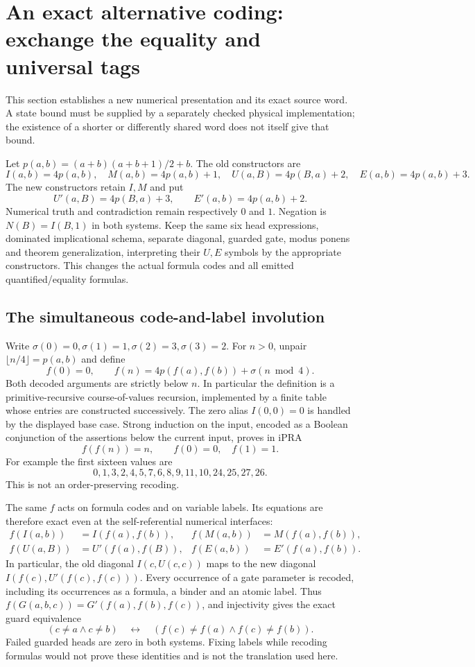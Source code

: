 \section{An exact alternative coding: exchange the equality and universal tags}
\label{sec:ue-tag-swap}

This section establishes a new numerical presentation and its exact source
word.  A state bound must be supplied by a separately checked physical
implementation; the existence of a shorter or differently shared word does
not itself give that bound.

Let $p(a,b)=(a+b)(a+b+1)/2+b$.  The old constructors are
\[
 I(a,b)=4p(a,b),\quad M(a,b)=4p(a,b)+1,\quad
 U(a,B)=4p(B,a)+2,\quad E(a,b)=4p(a,b)+3.
\]
The new constructors retain $I,M$ and put
\[
       U'(a,B)=4p(B,a)+3,\qquad E'(a,b)=4p(a,b)+2.
\]
Numerical truth and contradiction remain respectively $0$ and $1$.
Negation is $N(B)=I(B,1)$ in both systems.  Keep the same six head
expressions, dominated implicational schema, separate diagonal, guarded
gate, modus ponens and theorem generalization, interpreting their $U,E$
symbols by the appropriate constructors.  This changes the actual formula
codes and all emitted quantified/equality formulas.

\subsection{The simultaneous code-and-label involution}

Write $\sigma(0)=0,\sigma(1)=1,\sigma(2)=3,\sigma(3)=2$.
For $n>0$, unpair $\lfloor n/4\rfloor=p(a,b)$ and define
\[
 f(0)=0,\qquad f(n)=4p(f(a),f(b))+\sigma(n\bmod4).
\]
Both decoded arguments are strictly below $n$.  In particular the
definition is a primitive-recursive course-of-values recursion, implemented
by a finite table whose entries are constructed successively.  The zero
alias $I(0,0)=0$ is handled by the displayed base case.  Strong induction
on the input, encoded as a Boolean conjunction of the assertions below the
current input, proves in iPRA
\[
                 f(f(n))=n,\qquad f(0)=0,\quad f(1)=1.
\]
For example the first sixteen values are
\[
 0,1,3,2,4,5,7,6,8,9,11,10,24,25,27,26.
\]
This is not an order-preserving recoding.

The same $f$ acts on formula codes and on variable labels.  Its equations
are therefore exact even at the self-referential numerical interfaces:
\[
\begin{aligned}
 f(I(a,b))&=I(f(a),f(b)),&
 f(M(a,b))&=M(f(a),f(b)),\\
 f(U(a,B))&=U'(f(a),f(B)),&
 f(E(a,b))&=E'(f(a),f(b)).
\end{aligned}
\]
In particular, the old diagonal $I(c,U(c,c))$ maps to the new diagonal
$I(f(c),U'(f(c),f(c)))$.  Every occurrence of a gate parameter is recoded,
including its occurrences as a formula, a binder and an atomic label.
Thus $f(G(a,b,c))=G'(f(a),f(b),f(c))$, and injectivity gives the exact guard
equivalence
\[
 (c\ne a\land c\ne b)
 \quad\longleftrightarrow\quad
 (f(c)\ne f(a)\land f(c)\ne f(b)).
\]
Failed guarded heads are zero in both systems.  Fixing labels while
recoding formulas would not prove these identities and is not the
translation used here.


